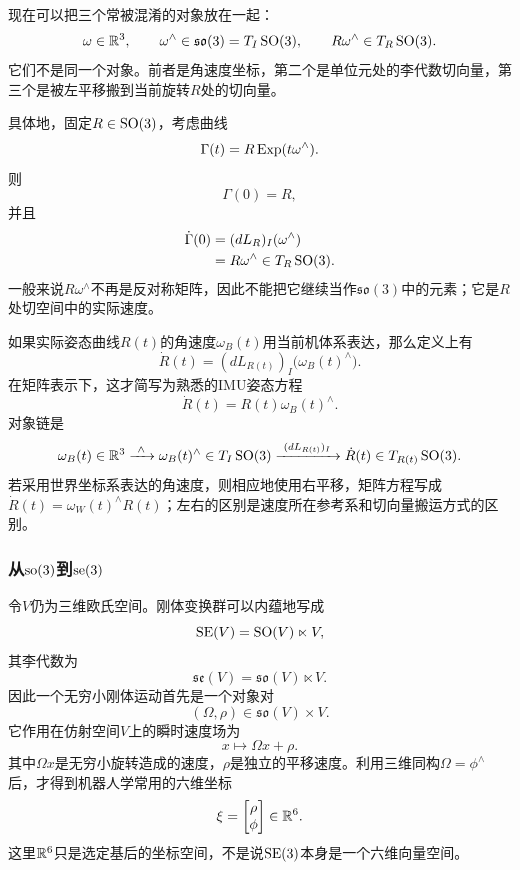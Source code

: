 现在可以把三个常被混淆的对象放在一起：
\[
    \omega\in\mathbb{R}^3,
    \qquad
    \omega^\wedge\in\mathfrak{so}(3)=T_I\operatorname{SO}(3),
    \qquad
    R\omega^\wedge\in T_R\operatorname{SO}(3).
\]
它们不是同一个对象。前者是角速度坐标，第二个是单位元处的李代数切向量，第三个是被左平移搬到当前旋转$R$处的切向量。

具体地，固定$R\in\operatorname{SO}(3)$，考虑曲线
\[
    \Gamma(t)=R\operatorname{Exp}(t\omega^\wedge).
\]
则
\[
    \Gamma(0)=R,
\]
并且
\[
\begin{aligned}
    \dot\Gamma(0)
    &=(dL_R)_I(\omega^\wedge)\\
    &=R\omega^\wedge
    \in T_R\operatorname{SO}(3).
\end{aligned}
\]
一般来说$R\omega^\wedge$不再是反对称矩阵，因此不能把它继续当作$\mathfrak{so}(3)$中的元素；它是$R$处切空间中的实际速度。

如果实际姿态曲线$R(t)$的角速度$\omega_B(t)$用当前机体系表达，那么定义上有
\[
    \dot R(t)
    =(dL_{R(t)})_I\bigl(\omega_B(t)^\wedge\bigr).
\]
在矩阵表示下，这才简写为熟悉的IMU姿态方程
\[
    \boxed{
    \dot R(t)=R(t)\omega_B(t)^\wedge.
    }
\]
对象链是
\[
    \omega_B(t)\in\mathbb{R}^3
    \xrightarrow{\ \wedge\ }
    \omega_B(t)^\wedge\in T_I\operatorname{SO}(3)
    \xrightarrow{\ (dL_{R(t)})_I\ }
    \dot R(t)\in T_{R(t)}\operatorname{SO}(3).
\]
若采用世界坐标系表达的角速度，则相应地使用右平移，矩阵方程写成$\dot R(t)=\omega_W(t)^\wedge R(t)$；左右的区别是速度所在参考系和切向量搬运方式的区别。

\subsubsection*{从$\operatorname{so}(3)$到$\operatorname{se}(3)$}

令$V$仍为三维欧氏空间。刚体变换群可以内蕴地写成
\[
    \operatorname{SE}(V)=\operatorname{SO}(V)\ltimes V,
\]
其李代数为
\[
    \mathfrak{se}(V)
    =\mathfrak{so}(V)\ltimes V.
\]
因此一个无穷小刚体运动首先是一个对象对
\[
    (\Omega,\rho)\in\mathfrak{so}(V)\times V.
\]
它作用在仿射空间$V$上的瞬时速度场为
\[
    x\longmapsto\Omega x+\rho.
\]
其中$\Omega x$是无穷小旋转造成的速度，$\rho$是独立的平移速度。利用三维同构$\Omega=\phi^\wedge$后，才得到机器人学常用的六维坐标
\[
    \xi=
    \begin{bmatrix}
        \rho\\\phi
    \end{bmatrix}
    \in\mathbb{R}^6.
\]
这里$\mathbb{R}^6$只是选定基后的坐标空间，不是说$\operatorname{SE}(3)$本身是一个六维向量空间。

